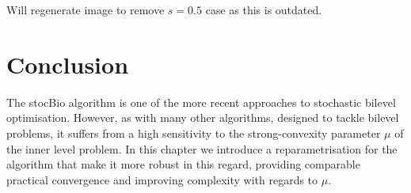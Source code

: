 \documentclass[11pt, twoside]{report}
\begin{document}
\begin{mdframed}[hidealllines=true,backgroundcolor=yellow!20]
    Will regenerate image to remove $s=0.5$ case as this is outdated.
\end{mdframed}

\section{Conclusion}
The stocBio algorithm is one of the more recent approaches to stochastic bilevel optimisation. However, as with many other algorithms, designed to tackle bilevel problems, it suffers from a high sensitivity to the strong-convexity parameter $\mu$ of the inner level problem. In this chapter we introduce a reparametrisation for the algorithm that make it more robust in this regard, providing comparable practical convergence and improving complexity with regards to $\mu$.





\appendix
\end{document}
